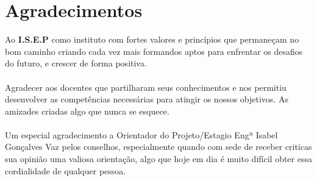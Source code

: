 \cleardoublepage
\chapter*{Agradecimentos}
\label{Agradecimentos}
Ao \textbf{I.S.E.P} como instituto com fortes valores e princípios que permaneçam no bom caminho criando cada vez mais formandos aptos para enfrentar os desafios do futuro, e crescer de forma positiva.\\
\\
Agradecer aos docentes que partilharam seus conhecimentos e nos permitiu desenvolver as competências necessárias para atingir os nossos objetivos. As amizades criadas algo que nunca se esquece.\\
\\
Um especial agradecimento a Orientador do Projeto/Estagio Engª Isabel Gonçalves Vaz pelos conselhos, especialmente quando com sede de receber criticas sua opinião uma valiosa orientação, algo que hoje em dia é muito difícil obter essa cordialidade de qualquer pessoa.
